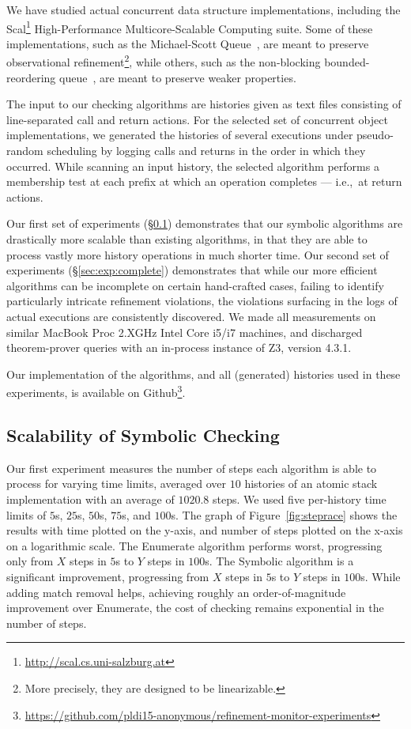 We have studied actual concurrent data structure implementations, including the
Scal\footnote{\url{http://scal.cs.uni-salzburg.at}} High-Performance
Multicore-Scalable Computing suite. Some of these implementations, such as the
Michael-Scott Queue~\cite{conf/podc/MichaelS96}, are meant to preserve
observational refinement\footnote{More precisely, they are designed to be
linearizable.}, while others, such as the non-blocking bounded-reordering
queue~\cite{conf/pact/KirschLP13}, are meant to preserve weaker properties.

The input to our checking algorithms are histories given as text files
consisting of line-separated call and return actions. For the selected set of
concurrent object implementations, we generated the histories of several
executions under pseudo-random scheduling by logging calls and returns in the
order in which they occurred. While scanning an input history, the selected
algorithm performs a membership test at each prefix at which an operation
completes --- i.e.,~at return actions.

Our first set of experiments (\S\ref{sec:exp:scalable}) demonstrates that our
symbolic algorithms are drastically more scalable than existing algorithms, in
that they are able to process vastly more history operations in much shorter
time. Our second set of experiments (\S\ref{sec:exp:complete}) demonstrates
that while our more efficient algorithms can be incomplete on certain
hand-crafted cases, failing to identify particularly intricate refinement
violations, the violations surfacing in the logs of actual executions are
consistently discovered. We made all measurements on similar MacBook Proc
2.XGHz Intel Core i5/i7 machines, and discharged theorem-prover queries with
an in-process instance of Z3, version 4.3.1.

Our implementation of the algorithms, and all (generated) histories used in
these experiments, is available on
Github\footnote{\url{https://github.com/pldi15-anonymous/refinement-monitor-experiments}}.

\subsection{Scalability of Symbolic Checking}
\label{sec:exp:scalable}

Our first experiment measures the number of steps each algorithm is able to
process for varying time limits, averaged over $10$ histories of an atomic
stack implementation with an average of $1020.8$ steps. We used five
per-history time limits of $5$s, $25$s, $50$s, $75$s, and $100$s. The graph of
Figure~\ref{fig:steprace} shows the results with time plotted on the y-axis,
and number of steps plotted on the x-axis on a logarithmic scale. The {\sc
Enumerate} algorithm performs worst, progressing only from $X$ steps in $5$s to
$Y$ steps in $100$s. The {\sc Symbolic} algorithm is a significant improvement,
progressing from $X$ steps in $5$s to $Y$ steps in $100$s. While adding match
removal helps, achieving roughly an order-of-magnitude improvement over {\sc
Enumerate}, the cost of checking remains exponential in the number of steps.

